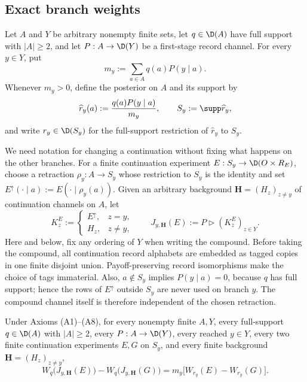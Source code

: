 \subsection{Exact branch weights}

Let $A$ and $Y$ be arbitrary nonempty finite sets, let $q\in\D(A)$ have full
support with $\lvert A\rvert\ge2$, and let
$P:A\to\D(Y)$ be a first-stage record channel.  For every $y\in Y$, put
\[
m_y:=\sum_{a\in A}q(a)P(y\mid a).
\]
Whenever $m_y>0$, define the posterior on $A$ and its support by
\[
\widehat r_y(a):=\frac{q(a)P(y\mid a)}{m_y},
\qquad
S_y:=\supp\widehat r_y,
\]
and write $r_y\in\D(S_y)$ for the full-support restriction of
$\widehat r_y$ to $S_y$.

We need notation for changing a continuation without fixing what happens on
the other branches.  For a finite continuation experiment
$E:S_y\to\D(O\times R_E)$, choose a retraction
$\rho_y:A\to S_y$ whose restriction to $S_y$ is the identity and set
$E^\uparrow(\cdot\mid a):=E(\cdot\mid\rho_y(a))$.  Given an arbitrary
background $\mathbf H=(H_z)_{z\ne y}$ of continuation channels on $A$, let
\[
K_z^E:=
\begin{cases}
E^\uparrow,&z=y,\\
H_z,&z\ne y,
\end{cases}
\qquad
J_{y,\mathbf H}(E):=P\triangleright(K_z^E)_{z\in Y}.
\]
Here and below, fix any ordering of $Y$ when writing the compound.
Before taking the compound, all continuation record alphabets are embedded as
tagged copies in one finite disjoint union.  Payoff-preserving record
isomorphisms make the choice of tags immaterial.  Also,
$a\notin S_y$ implies $P(y\mid a)=0$, because $q$ has full support; hence the
rows of $E^\uparrow$ outside $S_y$ are never used on branch $y$.
The compound channel itself is therefore independent of the chosen
retraction.

\begin{lemma}\label{lf:lem:branch-weight}
Under Axioms \textup{(A1)--(A8)}, for every nonempty finite $A,Y$, every
full-support $q\in\D(A)$ with $\lvert A\rvert\ge2$, every
$P:A\to\D(Y)$, every reached $y\in Y$, every two finite continuation
experiments $E,G$ on $S_y$, and every finite background
$\mathbf H=(H_z)_{z\ne y}$,
\begin{equation}
W_q\bigl(J_{y,\mathbf H}(E)\bigr)
-W_q\bigl(J_{y,\mathbf H}(G)\bigr)
=m_y\bigl[W_{r_y}(E)-W_{r_y}(G)\bigr].
\label{lf:eq:branch-weight}
\end{equation}
\end{lemma}

